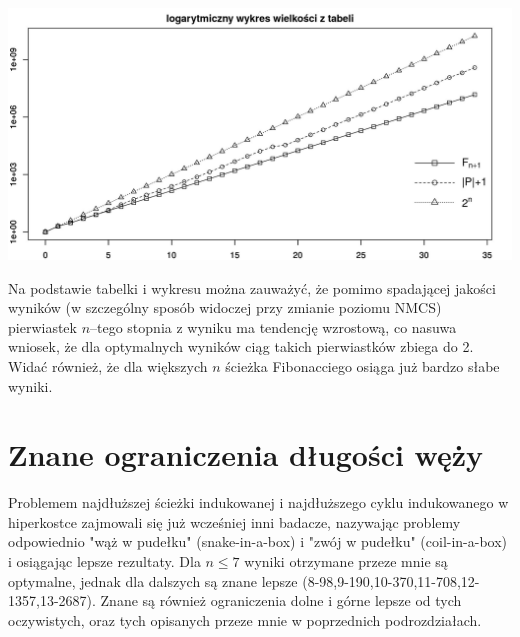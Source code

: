\documentclass{pracamgr}
\begin{document}
     \begin{center}
      \includegraphics[scale=0.55]{img/plot1.jpg}
     \end{center}
     Na podstawie tabelki i wykresu można zauważyć, że pomimo spadającej jakości wyników (w szczególny sposób widoczej przy zmianie poziomu NMCS) pierwiastek
     $n$--tego stopnia z wyniku ma tendencję wzrostową, co nasuwa wniosek, że dla optymalnych wyników ciąg takich pierwiastków zbiega do 2. 
     Widać również, że dla większych $n$ ścieżka Fibonacciego  osiąga już bardzo słabe wyniki.
   \section{Znane ograniczenia długości węży}
    Problemem najdłuższej ścieżki indukowanej i najdłuższego cyklu indukowanego w hiperkostce zajmowali się już wcześniej inni badacze, nazywając
    problemy odpowiednio "wąż w pudełku" (snake-in-a-box) i "zwój w pudełku" (coil-in-a-box) i osiągając lepsze rezultaty.\newline
    Dla $n\le7$ wyniki otrzymane przeze mnie są optymalne, jednak dla dalszych są znane lepsze\newline
    (8-98,9-190,10-370,11-708,12-1357,13-2687).
    Znane są również ograniczenia dolne i górne lepsze od tych oczywistych, oraz tych opisanych przeze mnie w poprzednich podrozdziałach.
\end{document}
